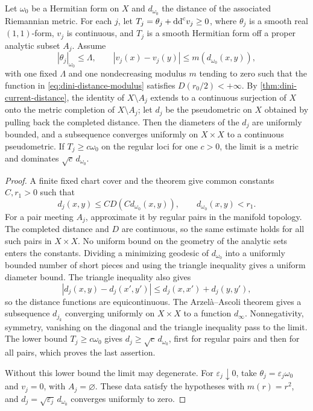 \begin{corollary}\label{cor:dini-family-distance-limits}
Let $\omega_0$ be a Hermitian form on $X$ and $d_{\omega_0}$ the distance of the associated Riemannian metric. For each $j$, let $T_j=\theta_j+\mathrm{dd}^{\mathrm{c}} v_j\geq0$, where $\theta_j$ is a smooth real $(1,1)$-form, $v_j$ is continuous, and $T_j$ is a smooth Hermitian form off a proper analytic subset $A_j$. Assume
\[
 |\theta_j|_{\omega_0}\leq\Lambda,\qquad
 |v_j(x)-v_j(y)|\leq m(d_{\omega_0}(x,y)),
\]
with one fixed $\Lambda$ and one nondecreasing modulus $m$ tending to zero such that the function in \eqref{eq:dini-distance-modulus} satisfies $D(r_0/2)<+\infty$. By \cref{thm:dini-current-distance}, the identity of $X\setminus A_j$ extends to a continuous surjection of $X$ onto the metric completion of $X\setminus A_j$; let $d_j$ be the pseudometric on $X$ obtained by pulling back the completed distance. Then the diameters of the $d_j$ are uniformly bounded, and a subsequence converges uniformly on $X\times X$ to a continuous pseudometric. If $T_j\geq c\omega_0$ on the regular loci for one $c>0$, the limit is a metric and dominates $\sqrt c\,d_{\omega_0}$.
\end{corollary}
\begin{proof}
A finite fixed chart cover and the theorem give common constants $C,r_1>0$ such that
\[
 d_j(x,y)\leq CD(Cd_{\omega_0}(x,y)),
 \qquad d_{\omega_0}(x,y)<r_1.
\]
For a pair meeting $A_j$, approximate it by regular pairs in the manifold topology. The completed distance and $D$ are continuous, so the same estimate holds for all such pairs in $X\times X$. No uniform bound on the geometry of the analytic sets enters the constants. Dividing a minimizing geodesic of $d_{\omega_0}$ into a uniformly bounded number of short pieces and using the triangle inequality gives a uniform diameter bound. The triangle inequality also gives
\[
 |d_j(x,y)-d_j(x',y')|
 \leq d_j(x,x')+d_j(y,y'),
\]
so the distance functions are equicontinuous. The Arzel\`a--Ascoli theorem gives a subsequence $d_{j_k}$ converging uniformly on $X\times X$ to a function $d_\infty$. Nonnegativity, symmetry, vanishing on the diagonal and the triangle inequality pass to the limit. The lower bound $T_j\geq c\omega_0$ gives $d_j\geq\sqrt c\,d_{\omega_0}$, first for regular pairs and then for all pairs, which proves the last assertion.

Without this lower bound the limit may degenerate. For $\varepsilon_j\downarrow0$, take $\theta_j=\varepsilon_j\omega_0$ and $v_j=0$, with $A_j=\varnothing$. These data satisfy the hypotheses with $m(r)=r^2$, and $d_j=\sqrt{\varepsilon_j}\,d_{\omega_0}$ converges uniformly to zero.
\end{proof}
